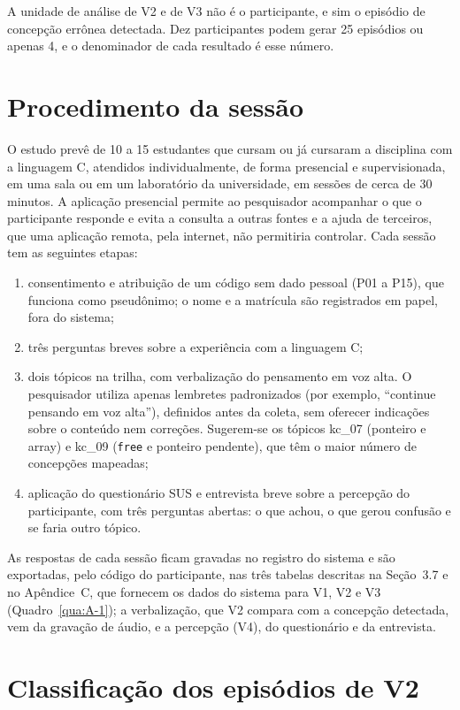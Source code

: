 A unidade de análise de V2 e de V3 não é o participante, e sim o episódio de concepção errônea detectada. Dez participantes podem gerar 25 episódios ou apenas 4, e o denominador de cada resultado é esse número.

\section{Procedimento da sessão}

O estudo prevê de 10 a 15 estudantes que cursam ou já cursaram a disciplina com a linguagem C, atendidos individualmente, de forma presencial e supervisionada, em uma sala ou em um laboratório da universidade, em sessões de cerca de 30 minutos. A aplicação presencial permite ao pesquisador acompanhar o que o participante responde e evita a consulta a outras fontes e a ajuda de terceiros, que uma aplicação remota, pela internet, não permitiria controlar. Cada sessão tem as seguintes etapas:

\begin{enumerate}
\item consentimento e atribuição de um código sem dado pessoal (P01 a P15), que funciona como pseudônimo; o nome e a matrícula são registrados em papel, fora do sistema;
\item três perguntas breves sobre a experiência com a linguagem C;
\item dois tópicos na trilha, com verbalização do pensamento em voz alta. O pesquisador utiliza apenas lembretes padronizados (por exemplo, ``continue pensando em voz alta''), definidos antes da coleta, sem oferecer indicações sobre o conteúdo nem correções. Sugerem-se os tópicos kc\_07 (ponteiro e array) e kc\_09 (\texttt{free} e ponteiro pendente), que têm o maior número de concepções mapeadas;
\item aplicação do questionário SUS e entrevista breve sobre a percepção do participante, com três perguntas abertas: o que achou, o que gerou confusão e se faria outro tópico.
\end{enumerate}

As respostas de cada sessão ficam gravadas no registro do sistema e são exportadas, pelo código do participante, nas três tabelas descritas na Seção~3.7 e no Apêndice~C, que fornecem os dados do sistema para V1, V2 e V3 (Quadro~\ref{qua:A-1}); a verbalização, que V2 compara com a concepção detectada, vem da gravação de áudio, e a percepção (V4), do questionário e da entrevista.

\section{Classificação dos episódios de V2}

